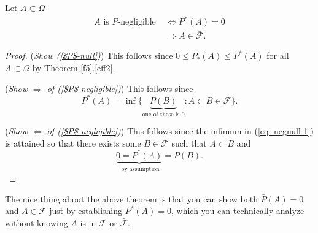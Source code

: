 \begin{theorem}
Let $A\subset \Omega$
\begin{align}
\text{$A$ is $P$-negligible }&\Longleftrightarrow P^*(A)=0\label{$P$-negligible}\\
&\Longrightarrow A\in \bar{\mathcal F} \label{$P$-null}.
\end{align}
\end{theorem}
\begin{proof}
({\sl Show (\ref{$P$-null})}) This follows since $0\leq P_*(A)\leq P^*(A)$ for all $A\subset \Omega$ by Theorem \ref{f5}.\ref{eff2}.

({\sl Show $\Longrightarrow$ of (\ref{$P$-negligible})}) This follows since
\begin{equation}
\label{eq: negnull 1}
 P^*(A) = \inf\{\underbrace{P(B)}_{\text{one of these is $0$}}\colon A\subset B\in \mathcal F  \}.
 \end{equation}

({\sl Show $\Longleftarrow$ of (\ref{$P$-negligible})})
This follows since the infimum in (\ref{eq: negnull 1}) is attained so that there exists some $B\in \mathcal F$ such that $A\subset B $ and
\[  \underbrace{0 = P^*(A)}_{\text{ by assumption}}=P(B). \]

\end{proof}

The nice  thing about the above theorem is that you can show both $\bar P(A) = 0$ and $A\in \bar{\mathcal F}$ just by establishing $P^*(A)=0$, which you can technically analyze without knowing $A$ is in $\mathcal F$ or $\bar{\mathcal F}$.



